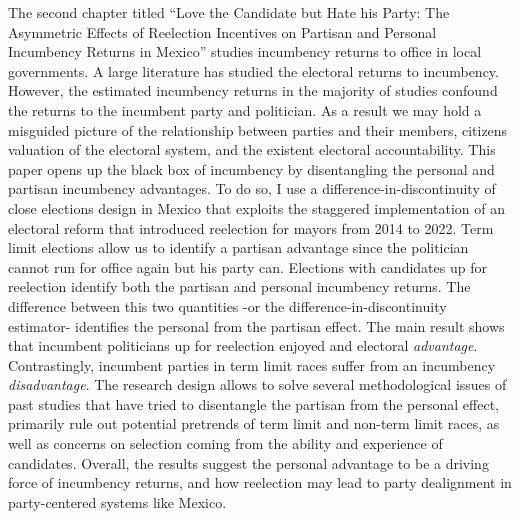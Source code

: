 The second chapter titled ``Love the Candidate but Hate his Party: The Asymmetric Effects of Reelection Incentives on Partisan and Personal Incumbency Returns in Mexico'' studies incumbency returns to office in local governments. A large literature has studied the electoral returns to incumbency. However, the estimated incumbency returns in the majority of studies confound the returns to the incumbent party and politician. As a result we may hold a misguided picture of the relationship between parties and their members, citizens valuation of the electoral system, and the existent electoral accountability. This paper opens up the black box of incumbency by disentangling the personal and partisan incumbency advantages. To do so, I use a difference-in-discontinuity of close elections design in Mexico that exploits the staggered implementation of an electoral reform that introduced reelection for mayors from 2014 to 2022. Term limit elections allow us to identify a partisan advantage since the politician cannot run for office again but his party can. Elections with candidates up for reelection identify both the partisan and personal incumbency returns.  The difference between this two quantities -or the difference-in-discontinuity estimator- identifies the personal from the partisan effect. The main result shows that incumbent politicians up for reelection enjoyed and electoral \emph{advantage}. Contrastingly, incumbent parties in term limit races suffer from an incumbency \emph{disadvantage}. The research design allows to solve several methodological issues of past studies that have tried to disentangle the partisan from the personal effect, primarily rule out potential pretrends of term limit and non-term limit races, as well as concerns on selection coming from the ability and experience of candidates. Overall, the results suggest the personal advantage to be a driving force of incumbency returns, and how  reelection may lead to party dealignment in party-centered systems like Mexico. 

